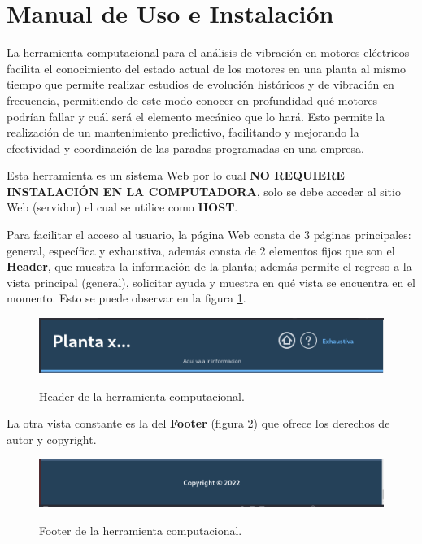 \documentclass[12pt]{article}
\begin{document}
\section{Manual de Uso e Instalación}\label{anexoA}

La herramienta computacional para el análisis de vibración en motores eléctricos
facilita el conocimiento del estado actual de los motores en una planta al mismo
tiempo que permite realizar estudios de evolución históricos y de vibración en
frecuencia, permitiendo de este modo conocer en profundidad qué motores podrían
fallar y cuál será el elemento mecánico que lo hará. Esto permite la realización
de un mantenimiento predictivo, facilitando y mejorando la efectividad y
coordinación de las paradas programadas en una empresa.

Esta herramienta es un sistema Web por lo cual \textbf{NO REQUIERE INSTALACIÓN
EN LA COMPUTADORA}, solo se debe acceder al sitio Web (servidor) el cual se
utilice como \textbf{HOST}.

Para facilitar el acceso al usuario, la página Web consta de 3 páginas principales:
general, específica y exhaustiva, además consta de 2 elementos fijos que son el
\textbf{Header}, que muestra la información de la planta;  además permite
el regreso a la vista principal (general),  solicitar ayuda y muestra en qué
vista se encuentra en el momento. Esto se puede observar en la figura
\ref{img:HeaderHerramienta}.

    \begin{figure}[H]
		\centering
        \caption{Header de la herramienta computacional. }
        \includegraphics[width=\linewidth]{ManualUsuario/header.png}
        \label{img:HeaderHerramienta}
	\end{figure}

La otra vista constante es la del \textbf{Footer} (figura
\ref{img:FooterHerramienta}) que ofrece los derechos de autor
y copyright.

    \begin{figure}[H]
		\centering
        \caption{Footer de la herramienta computacional. }
        \includegraphics[width=\linewidth]{ManualUsuario/footer.png}
        \label{img:FooterHerramienta}
	\end{figure}
\end{document}
